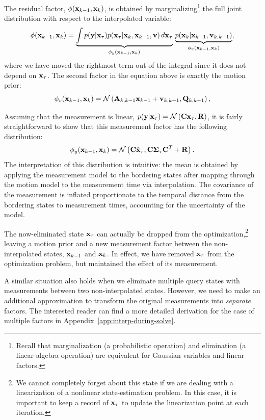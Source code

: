 The residual factor, $\phi(\mathbf{x}_{k-1}, \mathbf{x}_{k})$, is obtained by marginalizing\footnote{Recall that marginalization (a probabilistic operation) and elimination (a linear-algebra operation) are equivalent for Gaussian variables and linear factors.} the full joint distribution with respect to the interpolated variable:
\begin{equation}
     \phi(\mathbf{x}_{k-1}, \mathbf{x}_{k}) = \underbrace{\int p(\mathbf{y}| \mathbf{x}_{\tau}) p(\mathbf{x}_{\tau}|\mathbf{x}_k, \mathbf{x}_{k-1}, \mathbf{v})  \, d\mathbf{x}_{\tau}}_{\phi_y(\mathbf{x}_{k-1}, \mathbf{x}_{k})} \, \underbrace{p(\mathbf{x}_k|\mathbf{x}_{k-1}, \mathbf{v}_{k,k-1})}_{\phi_v(\mathbf{x}_{k-1}, \mathbf{x}_{k})},
\end{equation}
where we have moved the rightmost term out of the integral since it does not depend on $\mathbf{x}_{\tau}$. The second factor in the equation above is exactly the motion prior:
\begin{equation}
     \phi_v(\mathbf{x}_{k-1}, \mathbf{x}_{k}) = \mathcal{N}\left(\mathbf{A}_{k,k-1}\mathbf{x}_{k-1} + \mathbf{v}_{k,k-1}, \mathbf{Q}_{k,k-1} \right),
\end{equation}

Assuming that the measurement is linear, $p(\mathbf{y}| \mathbf{x}_{\tau})=\mathcal{N}\left(\mathbf{C} \mathbf{x}_{\tau}, \mathbf{R}\right)$, it is fairly straightforward to show that this measurement factor has the following distribution:
\begin{equation}\label{eq:wrapped_factor_simple}
     \phi_{y}(\mathbf{x}_{k-1}, \mathbf{x}_{k}) = \mathcal{N}\left(\mathbf{C} \check{\mathbf{x}}_{\tau}, \mathbf{C} \mathbf{\Sigma}_{\tau}\mathbf{C}^T + \mathbf{R} \right).
\end{equation}
The interpretation of this distribution is intuitive: the mean is obtained by applying the measurement model to the bordering states after mapping through the motion model to the measurement time via interpolation. The covariance of the measurement is inflated proportionate to the temporal distance from the bordering states to measurement times, accounting for the uncertainty of the model. 

The now-eliminated state $\mathbf{x}_{\tau}$ can actually be dropped from the optimization,\footnote{We cannot completely forget about this state if we are dealing with a linearization of a nonlinear state-estimation problem. In this case, it is important to keep a record of $\mathbf{x}_{\tau}$ to update the linearization point at each iteration.} leaving a motion prior and a new measurement factor between the non-interpolated states, $\mathbf{x}_{k-1}$ and $ \mathbf{x}_{k}$. In effect, we have removed $\mathbf{x}_{\tau}$ from the optimization problem, but maintained the effect of its measurement.

A similar situation also holds when we eliminate multiple query states with measurements between two non-interpolated states. However, we need to make an additional approximation to transform the original measurements into \emph{separate} factors. The interested reader can find a more detailed derivation for the case of multiple factors in Appendix~\ref{app:interp-during-solve}.



